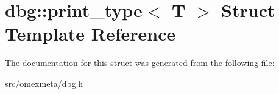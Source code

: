 \hypertarget{structdbg_1_1print__type}{}\section{dbg\+:\+:print\+\_\+type$<$ T $>$ Struct Template Reference}
\label{structdbg_1_1print__type}


The documentation for this struct was generated from the following file\+:\begin{DoxyCompactItemize}
\item 
src/omexmeta/dbg.\+h\end{DoxyCompactItemize}
